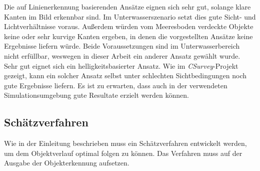 Die auf Linienerkennung basierenden Ansätze eignen sich sehr gut, solange klare Kanten im Bild erkennbar sind. Im Unterwasserszenario setzt dies gute Sicht- und Lichtverhältnisse voraus. Außerdem würden vom Meeresboden verdeckte Objekte keine oder sehr kurvige Kanten ergeben, in denen die vorgestellten Ansätze keine Ergebnisse liefern würde. Beide Voraussetzungen sind im Unterwasserbereich nicht erfüllbar, weswegen in dieser Arbeit ein anderer Ansatz gewählt wurde.\\
Sehr gut eignet sich ein helligkeitsbasierter Ansatz. Wie im \textit{CSurvey}-Projekt\cite{Albiez2015CSurveyA} gezeigt, kann ein solcher Ansatz selbst unter schlechten Sichtbedingungen noch gute Ergebnisse liefern. Es ist zu erwarten, dass auch in der verwendeten Simulationsumgebung gute Resultate erzielt werden können.\\
\subsection{Schätzverfahren}
Wie in der Einleitung beschrieben muss ein Schätzverfahren entwickelt werden, um dem Objektverlauf optimal folgen zu können. Das Verfahren muss auf der Ausgabe der Objekterkennung aufsetzen.
